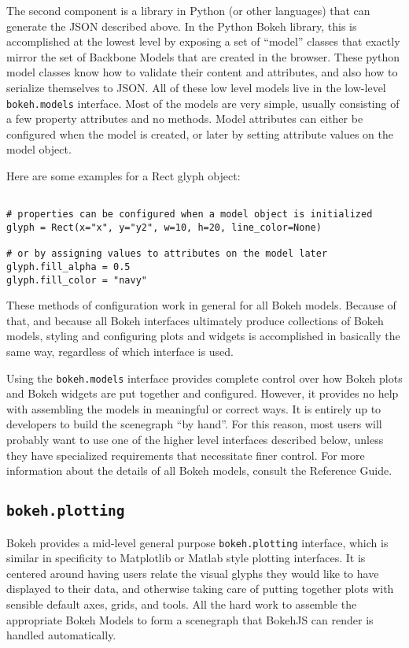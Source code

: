The second component is a library in Python (or other languages) that can generate the JSON described above. In the Python Bokeh library, this is accomplished at the lowest level by exposing a set of “model” classes that exactly mirror the set of Backbone Models that are created in the browser. These python model classes know how to validate their content and attributes, and also how to serialize themselves to JSON. All of these low level models live in the low-level \texttt{bokeh.models} interface. Most of the models are very simple, usually consisting of a few property attributes and no methods. Model attributes can either be configured when the model is created, or later by setting attribute values on the model object. 

Here are some examples for a Rect glyph object:

\begin{framed}
\begin{verbatim}

# properties can be configured when a model object is initialized
glyph = Rect(x="x", y="y2", w=10, h=20, line_color=None)

# or by assigning values to attributes on the model later
glyph.fill_alpha = 0.5
glyph.fill_color = "navy"
\end{verbatim}
\end{framed}
These methods of configuration work in general for all Bokeh models. Because of that, and because all Bokeh interfaces ultimately produce collections of Bokeh models, styling and configuring plots and widgets is accomplished in basically the same way, regardless of which interface is used.

Using the \texttt{bokeh.models} interface provides complete control over how Bokeh plots and Bokeh widgets are put together and configured. However, it provides no help with assembling the models in meaningful or correct ways. It is entirely up to developers to build the scenegraph “by hand”. For this reason, most users will probably want to use one of the higher level interfaces described below, unless they have specialized requirements that necessitate finer control. For more information about the details of all Bokeh models, consult the Reference Guide.

\subsection{\texttt{bokeh.plotting}}
Bokeh provides a mid-level general purpose \texttt{bokeh.plotting} interface, which is similar in specificity to Matplotlib or Matlab style plotting interfaces. It is centered around having users relate the visual glyphs they would like to have displayed to their data, and otherwise taking care of putting together plots with sensible default axes, grids, and tools. All the hard work to assemble the appropriate Bokeh Models to form a scenegraph that BokehJS can render is handled automatically.

